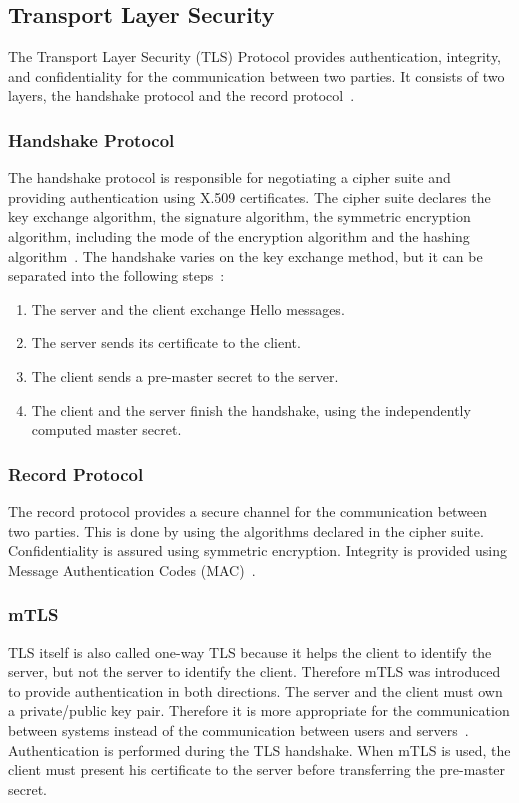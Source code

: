 \subsection{Transport Layer Security}
The Transport Layer Security (TLS) Protocol provides authentication, integrity, and confidentiality for the communication between two parties.
It consists of two layers, the handshake protocol and the record protocol~\cite{turnertls}.

\subsubsection{Handshake Protocol}
The handshake protocol is responsible for negotiating a cipher suite and providing authentication using X.509 certificates.
The cipher suite declares the key exchange algorithm, the signature algorithm, the symmetric encryption algorithm, including the mode of the encryption algorithm and the hashing algorithm~\cite{turnertls, kurbatov2021design}.
The handshake varies on the key exchange method, but it can be separated into the following steps~\cite{krawczyk2013security}:
\begin{enumerate}
    \item The server and the client exchange Hello messages.
    \item The server sends its certificate to the client.
    \item The client sends a pre-master secret to the server.
    \item The client and the server finish the handshake, using the independently computed master secret.
\end{enumerate}

\subsubsection{Record Protocol}
The record protocol provides a secure channel for the communication between two parties.
This is done by using the algorithms declared in the cipher suite.
Confidentiality is assured using symmetric encryption.
Integrity is provided using Message Authentication Codes (MAC)~\cite{kurbatov2021design, krawczyk2013security}.

\subsubsection{mTLS} \label{sec:mtls}
TLS itself is also called one-way TLS because it helps the client to identify the server, but not the server to identify the client.
Therefore mTLS was introduced to provide authentication in both directions.
The server and the client must own a private/public key pair.
Therefore it is more appropriate for the communication between systems instead of the communication between users and servers~\cite{dias2020microservices}. 
Authentication is performed during the TLS handshake.
When mTLS is used, the client must present his certificate to the server before transferring the pre-master secret.


